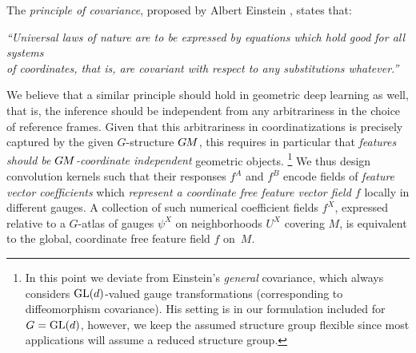 \begin{minipage}{\textwidth}
The \emph{principle of covariance}, proposed by Albert Einstein \cite{Einstein1916German,Einstein1916English}, states that:
\vspace*{1.ex}
\begin{center}
    \it
    ``Universal laws of nature are to be expressed by equations which hold good for all systems
    \\
    of coordinates, that is, are covariant with respect to any substitutions whatever.''
\end{center}
\vspace*{1.ex}
\end{minipage}
We believe that a similar principle should hold in geometric deep learning as well, that is, the inference should be independent from any arbitrariness in the choice of reference frames.
Given that this arbitrariness in coordinatizations is precisely captured by the given $G$-structure $G\mkern-1.4muM$, this requires in particular that \emph{features should be $G\mkern-1.4muM$-coordinate independent} geometric objects.%
\footnote{
    In this point we deviate from Einstein's \emph{general} covariance, which always considers $\operatorname{GL}(d)$-valued gauge transformations (corresponding to diffeomorphism covariance).
    His setting is in our formulation included for $G=\operatorname{GL}(d)$, however, we keep the assumed structure group flexible since most applications will assume a reduced structure group.
}
We thus design convolution kernels such that their responses $f^A$ and $f^B$ encode fields of \emph{feature vector coefficients} which \emph{represent a coordinate free feature vector field $f$} locally in different gauges.
A collection of such numerical coefficient fields $f^X$, expressed relative to a $G$-atlas of gauges $\psi^X$ on neighborhoods $U^X$ covering $M$, is equivalent to the global, coordinate free feature field $f$ on~$M$.


